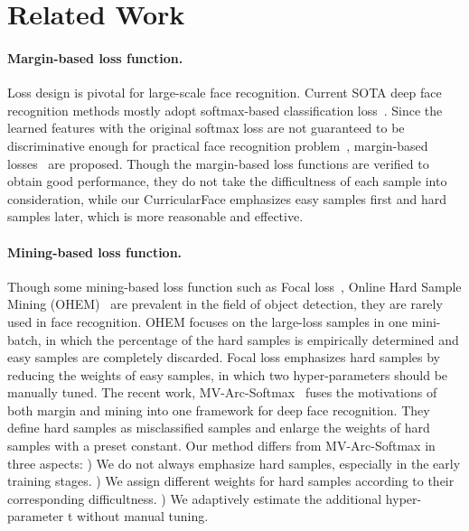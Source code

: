 \documentclass[10pt,twocolumn,letterpaper]{article}
\begin{document}
\section{Related Work}
\label{gen_inst}
\paragraph{Margin-based loss function.}
Loss design is pivotal for large-scale face recognition.
Current SOTA deep face recognition methods mostly adopt softmax-based classification loss~\cite{taigman2014deepface}.
Since the learned features with the original softmax loss are not guaranteed to be discriminative enough for practical face recognition problem~\cite{liu2017sphereface}, margin-based losses~\cite{liu2016large,liu2017sphereface, deng2018arcface} are proposed.
Though the margin-based loss functions are verified to obtain good performance, they do not take the difficultness of each sample into consideration, while our CurricularFace emphasizes easy samples first and hard samples later, which is more reasonable and effective.

\paragraph{Mining-based loss function.}
Though some mining-based loss function such as Focal loss~\cite{lin2017focal}, Online Hard Sample Mining (OHEM)~\cite{shrivastava2016training} are prevalent in the field of object detection, they are rarely used in face recognition.
OHEM focuses on the large-loss samples in one mini-batch, in which the percentage of the hard samples is empirically determined and easy samples are completely discarded. 
Focal loss emphasizes hard samples by reducing the weights of easy samples, in which two hyper-parameters should be manually tuned.
The recent work, MV-Arc-Softmax~\cite{wang2018support} fuses the motivations of both margin and mining into one framework for deep face recognition. They define hard samples as misclassified samples and enlarge the weights of hard samples with a preset constant.
Our method differs from MV-Arc-Softmax in three aspects:
) We do not always emphasize hard samples, especially in the early training stages.
) We assign different weights for hard samples according to their corresponding difficultness.
) We adaptively estimate the additional hyper-parameter t without manual tuning.
\end{document}
